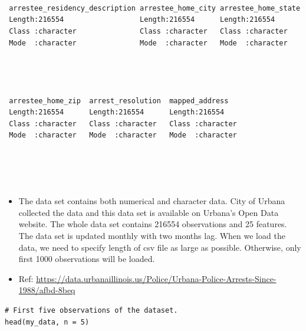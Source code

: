 \documentclass[
  article]{jss}
\begin{document}
\begin{verbatim}
                                                   
                                                   
                                                   
 arrestee_residency_description arrestee_home_city arrestee_home_state
 Length:216554                  Length:216554      Length:216554      
 Class :character               Class :character   Class :character   
 Mode  :character               Mode  :character   Mode  :character   
                                                                      
                                                                      
                                                                      
                                                                      
 arrestee_home_zip  arrest_resolution  mapped_address    
 Length:216554      Length:216554      Length:216554     
 Class :character   Class :character   Class :character  
 Mode  :character   Mode  :character   Mode  :character  
                                                         
                                                         
                                                         
                                                         
\end{verbatim}

\begin{itemize}
\item
  The data set contains both numerical and character data. City of
  Urbana collected the data and this data set is available on Urbana's
  Open Data website. The whole data set contains 216554 observations and
  25 features. The data set is updated monthly with two months lag. When
  we load the data, we need to specify length of csv file as large as
  possible. Otherwise, only first 1000 observations will be loaded.
\item
  Ref:
  \url{https://data.urbanaillinois.us/Police/Urbana-Police-Arrests-Since-1988/afbd-8beq}
\end{itemize}

\begin{verbatim}
# First five observations of the dataset. 
head(my_data, n = 5)
\end{verbatim}
\end{document}
